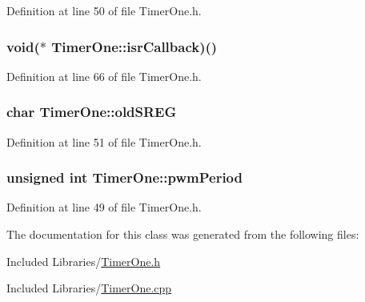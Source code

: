 \-Definition at line 50 of file \-Timer\-One.\-h.

\hypertarget{class_timer_one_aeed829a3f938c613579c10a015a3d1cb}{
\subsubsection[{isr\-Callback}]{\setlength{\rightskip}{0pt plus 5cm}void($\ast$ {\bf \-Timer\-One\-::isr\-Callback})()}}\label{class_timer_one_aeed829a3f938c613579c10a015a3d1cb}


\-Definition at line 66 of file \-Timer\-One.\-h.

\hypertarget{class_timer_one_ac71182fc3a2e44efbc796eb5260d3007}{
\subsubsection[{old\-S\-R\-E\-G}]{\setlength{\rightskip}{0pt plus 5cm}char {\bf \-Timer\-One\-::old\-S\-R\-E\-G}}}\label{class_timer_one_ac71182fc3a2e44efbc796eb5260d3007}


\-Definition at line 51 of file \-Timer\-One.\-h.

\hypertarget{class_timer_one_a6e5edd460d36e9c5c57cf647e86a3902}{
\subsubsection[{pwm\-Period}]{\setlength{\rightskip}{0pt plus 5cm}unsigned int {\bf \-Timer\-One\-::pwm\-Period}}}\label{class_timer_one_a6e5edd460d36e9c5c57cf647e86a3902}


\-Definition at line 49 of file \-Timer\-One.\-h.



\-The documentation for this class was generated from the following files\-:\begin{DoxyCompactItemize}
\item 
\-Included Libraries/\hyperlink{_timer_one_8h}{\-Timer\-One.\-h}\item 
\-Included Libraries/\hyperlink{_timer_one_8cpp}{\-Timer\-One.\-cpp}\end{DoxyCompactItemize}
